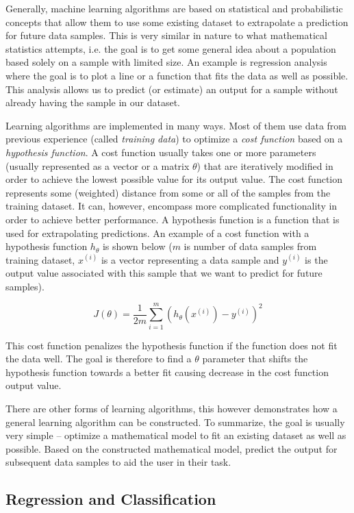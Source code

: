 Generally, machine learning algorithms are based on statistical and probabilistic concepts that allow them to use some existing dataset to extrapolate a prediction for future data samples. This is very similar in nature to what mathematical statistics attempts, i.e. the goal is to get some general idea about a population based solely on a sample with limited size. An example is regression analysis where the goal is to plot a line or a function that fits the data as well as possible. This analysis allows us to predict (or estimate) an output for a sample without already having the sample in our dataset.

Learning algorithms are implemented in many ways. Most of them use data from previous experience (called \textit{training data}) to optimize a \textit{cost function} based on a \textit{hypothesis function}. A cost function usually takes one or more parameters (usually represented as a vector or a matrix $\theta$) that are iteratively modified in order to achieve the lowest possible value for its output value. The cost function represents some (weighted) distance from some or all of the samples from the training dataset. It can, however, encompass more complicated functionality in order to achieve better performance. A hypothesis function is a function that is used for extrapolating predictions. An example of a cost function with a hypothesis function $h_\theta$ is shown below ($m$ is number of data samples from training dataset, $x^(i)$ is a vector representing a data sample and $y^{(i)}$ is the output value associated with this sample that we want to predict for future samples).

$$J(\theta) = \frac{1}{2m}\sum_{i=1}^m(h_\theta(x^{(i)}) - y^{(i)})^2$$

This cost function penalizes the hypothesis function if the function does not fit the data well. The goal is therefore to find a $\theta$ parameter that shifts the hypothesis function towards a better fit causing decrease in the cost function output value.

There are other forms of learning algorithms, this however demonstrates how a general learning algorithm can be constructed. To summarize, the goal is usually very simple -- optimize a mathematical model to fit an existing dataset as well as possible. Based on the constructed mathematical model, predict the output for subsequent data samples to aid the user in their task.

\subsection{Regression and Classification}

